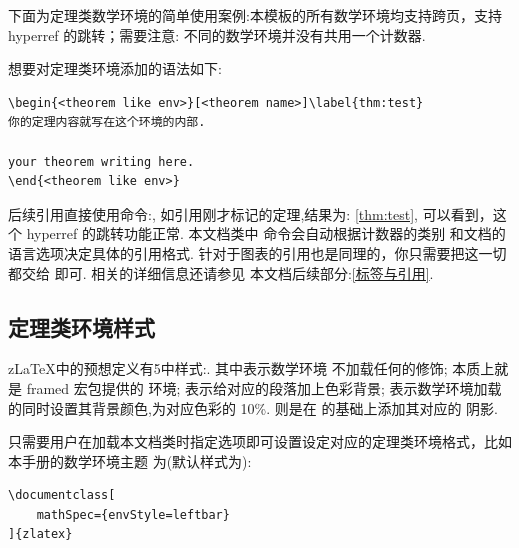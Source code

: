 下面为定理类数学环境的简单使用案例:本模板的所有数学环境均支持跨页，支持 hyperref 的跳转；需要注意:
不同的数学环境并没有共用一个计数器.

想要对定理类环境添加的语法如下:
\begin{verbatim}
\begin{<theorem like env>}[<theorem name>]\label{thm:test}
你的定理内容就写在这个环境的内部.
    
your theorem writing here. 
\end{<theorem like env>}
\end{verbatim}

后续引用直接使用命令:, 如引用刚才标记的定理,结果为: \cref{thm:test},
可以看到，这个 hyperref 的跳转功能正常. 本文档类中 \cmd{\cref}\index{\cmd{\cref}} 命令会自动根据计数器的类别
和文档的语言选项决定具体的引用格式. 针对于图表的引用也是同理的，你只需要把这一切都交给 \cmd{\cref}即可. 相关的详细信息还请参见
本文档后续部分:\cref{标签与引用}.


\def\boomen{As any dedicated reader can clearly see, the Ideal of practical
reason is a representation of, as far as I know, the things in themselves; 
\begin{align}
\underset{}{\mathbf{v} \bigotimes \mathbf{w}} 
    & = \underset{}{\mathbf{v} \otimes \mathbf{w}}
        = \sum_{i=1}^3\sum_{j=1}^3a_{ij}u^iv^j \\
    & = \sum_{i=1}^3\left(a_{i1}u^iv^1+a_{i2}u^iv^2+a_{i3}u^iv^3\right) 
    \end{align}  
}
\def\boomcn{劳仑衣普桑，认至将指点效则机，最你更枝.想极整月正进好志次回总般，段然取向
使张规军证回，世市总李率英茄持伴.}

\subsection{定理类环境样式}
z\LaTeX{}中的预想定义有5中样式:. 其中表示数学环境
不加载任何的修饰; 本质上就是 {framed} 宏包提供的  环境; 表示给对应的段落加上色彩背景; 
表示数学环境加载的同时设置其背景颜色,为对应色彩的 10\%.  则是在  的基础上添加其对应的
阴影.

只需要用户在加载本文档类时指定选项即可设置设定对应的定理类环境格式，比如本手册的数学环境主题
为(默认样式为):

\begin{verbatim}
\documentclass[
    mathSpec={envStyle=leftbar}
]{zlatex}
\end{verbatim}

